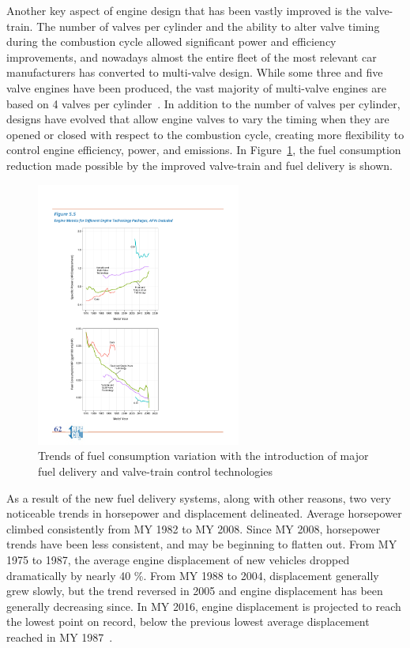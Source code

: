 Another key aspect of engine design that has been vastly improved is the valve-train. The number of valves per cylinder and the ability to alter valve timing during the combustion cycle allowed significant power and efficiency improvements, and nowadays almost the entire fleet of the most relevant car manufacturers has converted to multi-valve design. While some three and five valve engines have been produced, the vast majority of multi-valve engines are based on 4 valves per cylinder~\cite{EPA2016}. In addition to the number of valves per cylinder, designs have evolved that allow engine valves to vary the timing when they are opened or closed with respect to the combustion cycle, creating more flexibility to control engine efficiency, power, and emissions. In Figure~\ref{fig:improvement_valve_fuel_delivery}, the fuel consumption reduction made possible by the improved valve-train and fuel delivery is shown. 

\begin{figure}[ht]
  \centering
  \includegraphics[width=0.6\textwidth]{figures/review/improvement_valve_fuel_delivery.pdf}
  \caption{Trends of fuel consumption variation with the introduction of major fuel delivery and valve-train control technologies \label{fig:improvement_valve_fuel_delivery} }
\end{figure}

As a result of the new fuel delivery systems, along with other reasons, two very noticeable trends in horsepower and displacement delineated. Average horsepower climbed consistently from MY 1982 to MY 2008. Since MY 2008, horsepower trends have been less consistent, and may be beginning to flatten out. From MY 1975 to 1987, the average engine displacement of new vehicles dropped dramatically by nearly 40 \%. From MY 1988 to 2004, displacement generally grew slowly, but the trend reversed in 2005 and engine displacement has been generally decreasing since. In MY 2016, engine displacement is projected to reach the lowest point on record, below the previous lowest average displacement reached in MY 1987~\cite{EPA2016}.

